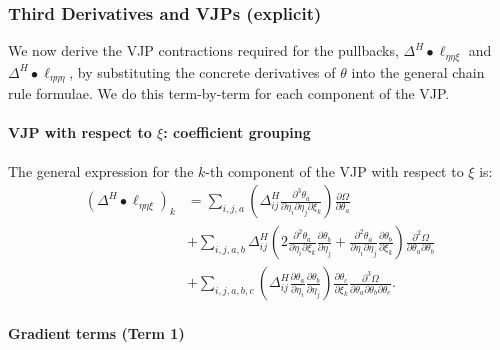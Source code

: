 \documentclass{article}
\begin{document}
\subsubsection{Third Derivatives and VJPs (explicit)}

We now derive the VJP contractions required for the pullbacks, $\Delta^H \bullet \ell_{\eta\eta\xi}$ and $\Delta^H \bullet \ell_{\eta\eta\eta}$, by substituting the concrete derivatives of $\theta$ into the general chain rule formulae.
We do this term-by-term for each component of the VJP.

\paragraph{VJP with respect to $\xi$: coefficient grouping}

The general expression for the $k$-th component of the VJP with respect to $\xi$ is:
%
\begin{align}
  (\Delta^H \bullet \ell_{\eta\eta\xi})_k & = \sum_{i,j,a} \left( \Delta^H_{ij} \frac{\partial^3 \theta_a}{\partial \eta_i \partial \eta_j \partial \xi_k} \right) \frac{\partial \Omega}{\partial \theta_a} \nonumber                                                                                                                                                          \\
                                          & + \sum_{i,j,a,b} \Delta^H_{ij} \left( 2 \frac{\partial^2 \theta_a}{\partial \eta_i \partial \xi_k} \frac{\partial \theta_b}{\partial \eta_j} + \frac{\partial^2 \theta_a}{\partial \eta_i \partial \eta_j} \frac{\partial \theta_b}{\partial \xi_k} \right) \frac{\partial^2 \Omega}{\partial \theta_a \partial \theta_b} \nonumber \\
                                          & + \sum_{i,j,a,b,c} \left( \Delta^H_{ij} \frac{\partial \theta_a}{\partial \eta_i} \frac{\partial \theta_b}{\partial \eta_j} \right) \frac{\partial \theta_c}{\partial \xi_k} \frac{\partial^3 \Omega}{\partial \theta_a \partial \theta_b \partial \theta_c}.
\end{align}

\paragraph{Gradient terms (Term 1)}
\end{document}
